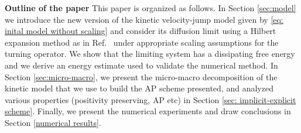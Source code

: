 \documentclass{aims} %
\theoremstyle{definition}
\begin{document}
\noindent\textbf{Outline of the paper} This paper is organized as follows. In Section \ref{sec:model} we {introduce the new version of the kinetic velocity-jump model given by \eqref{eq: inital model without scaling}} and consider its diffusion limit using a Hilbert expansion method as in Ref.~\cite{othmer2002diffusion} under appropriate scaling assumptions for the turning operator. We show that the limiting system has a dissipating free energy and we derive an energy estimate used to validate the numerical method. {In Section \ref{sec:micro-macro}, we present the micro-macro decomposition of the kinetic model that we use to build the AP scheme presented, and analyzed various properties (positivity preserving, AP etc) in Section \ref{sec: implicit-explicit scheme}.} Finally, we present the numerical experiments and draw conclusions in Section \ref{numerical results}. 
\end{document}
